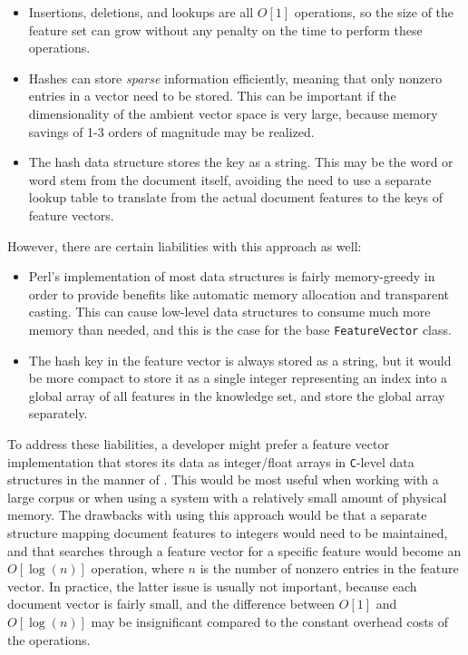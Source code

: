 \begin{itemize}
\item Insertions, deletions, and lookups are all $O[1]$
  operations, so the size of the feature set can grow without any
  penalty on the time to perform these operations.
\item Hashes can store \emph{sparse} information efficiently, meaning
  that only nonzero entries in a vector need to be stored.  This can
  be important if the dimensionality of the ambient vector space is
  very large, because memory savings of 1-3 orders of magnitude may be
  realized.
\item The hash data structure stores the key as a string.  This may be
  the word or word stem from the document itself, avoiding the need to
  use a separate lookup table to translate from the actual document
  features to the keys of feature vectors.
\end{itemize}

However, there are certain liabilities with this approach as well:

\begin{itemize}
\item Perl's implementation of most data structures is fairly
  memory-greedy in order to provide benefits like automatic memory
  allocation and transparent casting.  This can cause low-level data
  structures to consume much more memory than needed, and this is the
  case for the base \texttt{FeatureVector} class.
\item The hash key in the feature vector is always stored as a string,
  but it would be more compact to store it as a single integer
  representing an index into a global array of all features in the
  knowledge set, and store the global array separately.
\end{itemize}

To address these liabilities, a developer might prefer a feature
vector implementation that stores its data as integer/float arrays in
\texttt{C}-level data structures in the manner of \cite{platt:99}.
This would be most useful when working with a large corpus or when
using a system with a relatively small amount of physical memory.  The
drawbacks with using this approach would be that a separate structure
mapping document features to integers would need to be maintained, and
that searches through a feature vector for a specific feature would
become an $O[\log(n)]$ operation, where $n$ is the number of nonzero
entries in the feature vector.  In practice, the latter issue is
usually not important, because each document vector is fairly small,
and the difference between $O[1]$ and $O[\log(n)]$ may be
insignificant compared to the constant overhead costs of the
operations.

